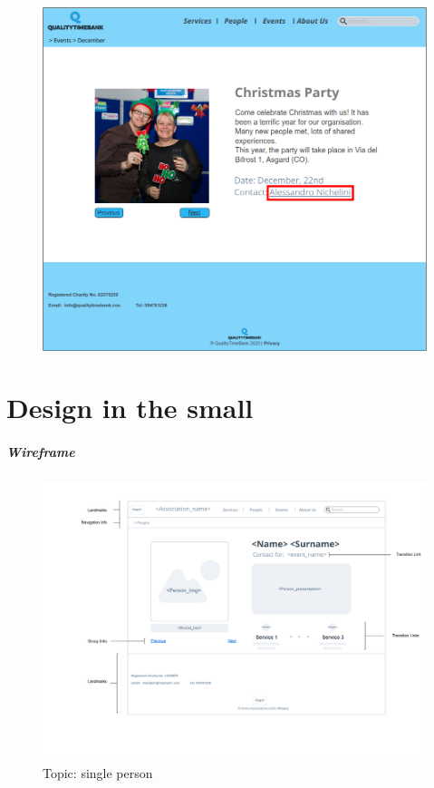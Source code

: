 \documentclass[a4paper, 11pt, parskip=half, headsepline]{scrreprt}
\begin{document}
\begin{figure}[H]
	\centering
	\includegraphics[width=1\linewidth, keepaspectratio]{scenarios/scenario-34}
	\caption{}
	\label{fig:scenario-34}
\end{figure}

\chapter{Design in the small}
\paragraph{Wireframe}

\begin{figure}[H]
    \centering
    \includegraphics[width=\linewidth, keepaspectratio]{wireframes/KindOfTopic-Person}
    \caption{Topic: single person}
    \label{fig:wireframe_single_person}
\end{figure}
\end{document}
